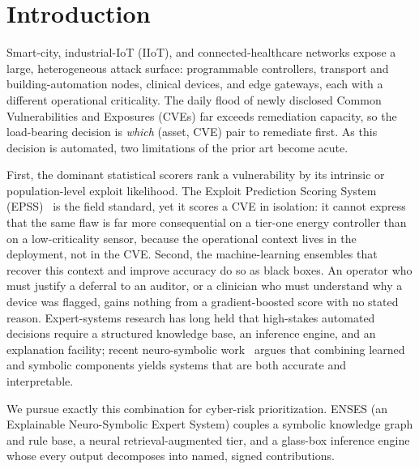 \documentclass[review,3p,times]{elsarticle}
\begin{document}
\section{Introduction}
\label{sec:intro}
Smart-city, industrial-IoT (IIoT), and connected-healthcare networks expose a
large, heterogeneous attack surface: programmable controllers, transport and
building-automation nodes, clinical devices, and edge gateways, each with a
different operational criticality. The daily flood of newly disclosed Common
Vulnerabilities and Exposures (CVEs) far exceeds remediation capacity, so the
load-bearing decision is \emph{which} (asset, CVE) pair to remediate first. As
this decision is automated, two limitations of the prior art become acute.

First, the dominant statistical scorers rank a vulnerability by its intrinsic
or population-level exploit likelihood. The Exploit Prediction Scoring System
(EPSS)~\cite{jacobs2021epss} is the field standard, yet it scores a CVE in
isolation: it cannot express that the same flaw is far more consequential on a
tier-one energy controller than on a low-criticality sensor, because the
operational context lives in the deployment, not in the CVE. Second, the
machine-learning ensembles that recover this context and improve accuracy do so
as black boxes. An operator who must justify a deferral to an auditor, or a
clinician who must understand why a device was flagged, gains nothing from a
gradient-boosted score with no stated reason. Expert-systems research has long
held that high-stakes automated decisions require a structured knowledge base,
an inference engine, and an explanation facility; recent neuro-symbolic
work~\cite{garcez2023neurosymbolic} argues that combining learned and symbolic
components yields systems that are both accurate and interpretable.

We pursue exactly this combination for cyber-risk prioritization. ENSES (an
Explainable Neuro-Symbolic Expert System) couples a symbolic knowledge graph
and rule base, a neural retrieval-augmented tier, and a glass-box inference
engine whose every output decomposes into named, signed contributions.
\end{document}
